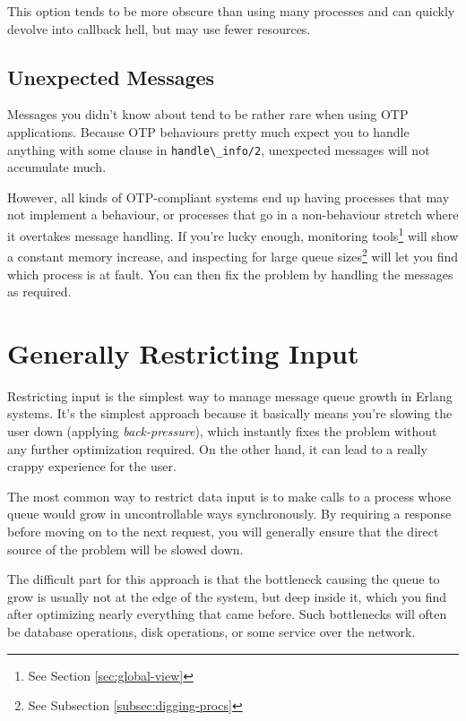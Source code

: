 \documentclass[11pt, oneside]{book}   	%
\newcommand{\function}[1]{\Verb`#1`}
\begin{document}
This option tends to be more obscure than using many processes and can quickly devolve into callback hell, but may use fewer resources.

\subsection{Unexpected Messages}

Messages you didn't know about tend to be rather rare when using OTP applications. Because OTP behaviours pretty much expect you to handle anything with some clause in \function{handle\_info/2}, unexpected messages will not accumulate much.

However, all kinds of OTP-compliant systems end up having processes that may not implement a behaviour, or processes that go in a non-behaviour stretch where it overtakes message handling. If you're lucky enough, monitoring tools\footnote{See Section \ref{sec:global-view}} will show a constant memory increase, and inspecting for large queue sizes\footnote{See Subsection \ref{subsec:digging-procs}} will let you find which process is at fault. You can then fix the problem by handling the messages as required.

\section{Generally Restricting Input}

Restricting input is the simplest way to manage message queue growth in Erlang systems. It's the simplest approach because it basically means you're slowing the user down (applying \emph{back-pressure}), which instantly fixes the problem without any further optimization required. On the other hand, it can lead to a really crappy experience for the user.

The most common way to restrict data input is to make calls to a process whose queue would grow in uncontrollable ways synchronously. By requiring a response before moving on to the next request, you will generally ensure that the direct source of the problem will be slowed down.

The difficult part for this approach is that the bottleneck causing the queue to grow is usually not at the edge of the system, but deep inside it, which you find after optimizing nearly everything that came before. Such bottlenecks will often be database operations, disk operations, or some service over the network. 
\end{document}
